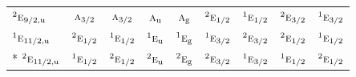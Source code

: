 \documentclass[10pt,a4paper]{article}
\numberwithin{equation}{section}
\newcommand{\irr}[1]{\text{\normalfont\scshape #1}}
\newcommand{\conjpair}[1]{{}^{#1}}
\newcommand{\ptag}[1]{\mathrm{#1}}
\begin{document}
{\begin{longtable}{@{}lcccccccc@{}}
$\conjpair{2}\irr{e}_{9/2,\ptag{u}}$ & $\irr{a}_{3/2}$ & $\irr{a}_{3/2}$ & $\irr{a}_{\ptag{u}}$ & $\irr{a}_{\ptag{g}}$ & $\conjpair{2}\irr{e}_{1/2}$ & $\conjpair{1}\irr{e}_{1/2}$ & $\conjpair{2}\irr{e}_{3/2}$ & $\conjpair{1}\irr{e}_{3/2}$\\
$\conjpair{1}\irr{e}_{11/2,\ptag{u}}$ & $\conjpair{2}\irr{e}_{1/2}$ & $\conjpair{1}\irr{e}_{1/2}$ & $\conjpair{1}\irr{e}_{\ptag{u}}$ & $\conjpair{1}\irr{e}_{\ptag{g}}$ & $\conjpair{1}\irr{e}_{3/2}$ & $\conjpair{2}\irr{e}_{3/2}$ & $\conjpair{2}\irr{e}_{1/2}$ & $\conjpair{1}\irr{e}_{1/2}$\\*
$\conjpair{2}\irr{e}_{11/2,\ptag{u}}$ & $\conjpair{1}\irr{e}_{1/2}$ & $\conjpair{2}\irr{e}_{1/2}$ & $\conjpair{2}\irr{e}_{\ptag{u}}$ & $\conjpair{2}\irr{e}_{\ptag{g}}$ & $\conjpair{2}\irr{e}_{3/2}$ & $\conjpair{1}\irr{e}_{3/2}$ & $\conjpair{1}\irr{e}_{1/2}$ & $\conjpair{2}\irr{e}_{1/2}$\\
\bottomrule\end{longtable}}
\end{document}
